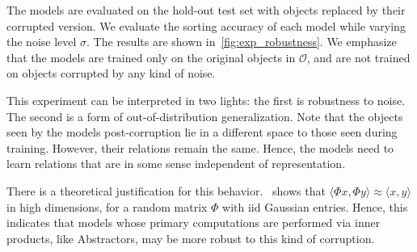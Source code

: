 The models are evaluated on the hold-out test set with objects replaced by their corrupted version. We evaluate the sorting accuracy of each model while varying the noise level $\sigma$. The results are shown in~\cref{fig:exp_robustness}. We emphasize that the models are trained only on the original objects in $\mathcal{O}$, and are not trained on objects corrupted by any kind of noise.

This experiment can be interpreted in two lights: the first is robustness to noise. The second is a form of out-of-distribution generalization. Note that the objects seen by the models post-corruption lie in a different space to those seen during training. However, their relations remain the same. Hence, the models need to learn relations that are in some sense independent of representation.

There is a theoretical justification for this behavior.~\cite{zhouCompressedPrivacySensitive2009} shows that $\langle \Phi x, \Phi y \rangle \approx \langle x, y \rangle$ in high dimensions, for a random matrix $\Phi$ with iid Gaussian entries. Hence, this indicates that models whose primary computations are performed via inner products, like Abstractors, may be more robust to this kind of corruption.